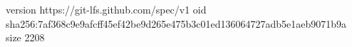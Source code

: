 version https://git-lfs.github.com/spec/v1
oid sha256:7af368c9e9afcff45ef42be9d265e475b3c01ed136064727adb5e1aeb9071b9a
size 2208
